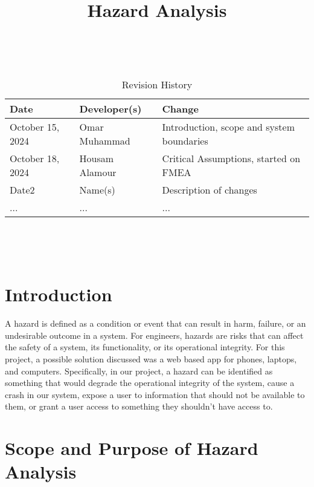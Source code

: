 \documentclass{article}
\title{Hazard Analysis\\\progname}
\author{\authname}
\date{}
\begin{document}
\maketitle
\thispagestyle{empty}

~\newpage


\begin{table}[hp]
\caption{Revision History} \label{TblRevisionHistory}
\begin{tabularx}{\textwidth}{llX}
\toprule
\textbf{Date} & \textbf{Developer(s)} & \textbf{Change}\\
\midrule
October 15, 2024 & Omar Muhammad & Introduction, scope and system boundaries\\
October 18, 2024 & Housam Alamour & Critical Assumptions, started on FMEA\\
Date2 & Name(s) & Description of changes\\
... & ... & ...\\
\bottomrule
\end{tabularx}
\end{table}

~\newpage

\tableofcontents

~\newpage



\section{Introduction}

A hazard is defined as a condition or event that can result in harm, failure, or an undesirable outcome in a system. For engineers, hazards are risks that can affect the safety of a system, its functionality, or its operational integrity. For this project, a possible solution discussed was a web based app for phones, laptops, and computers. Specifically, in our project, a hazard can be identified as something that would degrade the operational integrity of the system, cause a crash in our system, expose a user to information that should not be available to them, or grant a user access to something they shouldn't have access to.

\section{Scope and Purpose of Hazard Analysis}
\end{document}
